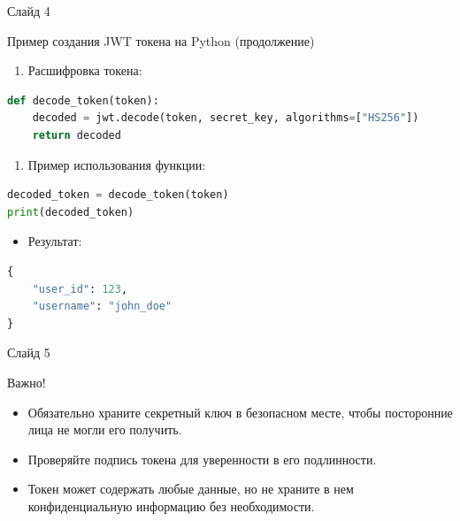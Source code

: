 \documentclass[
  ignorenonframetext,
  aspectratio=169,
  aspectratio=169]{beamer}
\providecommand{\tightlist}{%
  \setlength{\itemsep}{0pt}\setlength{\parskip}{0pt}}
\begin{document}
\begin{frame}[fragile]{Слайд 4}
\protect\hypertarget{ux441ux43bux430ux439ux434-4}{}
\begin{block}{Пример создания JWT токена на Python (продолжение)}
\protect\hypertarget{ux43fux440ux438ux43cux435ux440-ux441ux43eux437ux434ux430ux43dux438ux44f-jwt-ux442ux43eux43aux435ux43dux430-ux43dux430-python-ux43fux440ux43eux434ux43eux43bux436ux435ux43dux438ux435-1}{}
\begin{enumerate}
\tightlist
\item
  Расшифровка токена:
\end{enumerate}

\begin{lstlisting}[language=Python]
def decode_token(token):
    decoded = jwt.decode(token, secret_key, algorithms=["HS256"])
    return decoded
\end{lstlisting}

\begin{enumerate}
\tightlist
\item
  Пример использования функции:
\end{enumerate}

\begin{lstlisting}[language=Python]
decoded_token = decode_token(token)
print(decoded_token)
\end{lstlisting}

\begin{itemize}
\tightlist
\item
  Результат:
\end{itemize}

\begin{lstlisting}[language=Python]
{
    "user_id": 123,
    "username": "john_doe"
}
\end{lstlisting}
\end{block}
\end{frame}

\begin{frame}{Слайд 5}
\protect\hypertarget{ux441ux43bux430ux439ux434-5}{}
\begin{block}{Важно!}
\protect\hypertarget{ux432ux430ux436ux43dux43e}{}
\begin{itemize}
\tightlist
\item
  Обязательно храните секретный ключ в безопасном месте, чтобы
  посторонние лица не могли его получить.
\item
  Проверяйте подпись токена для уверенности в его подлинности.
\item
  Токен может содержать любые данные, но не храните в нем
  конфиденциальную информацию без необходимости.
\end{itemize}
\end{block}
\end{frame}
\end{document}
